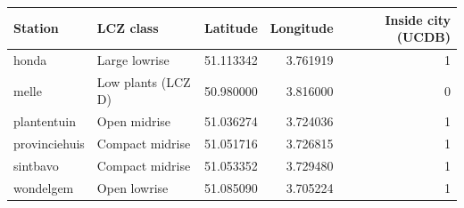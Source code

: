 \begin{tabular}{llrrr}
\toprule
Station & LCZ class & Latitude & Longitude & Inside city (UCDB) \\
\midrule
honda & Large lowrise & 51.113342 & 3.761919 & 1 \\
melle & Low plants (LCZ D) & 50.980000 & 3.816000 & 0 \\
plantentuin & Open midrise & 51.036274 & 3.724036 & 1 \\
provinciehuis & Compact midrise & 51.051716 & 3.726815 & 1 \\
sintbavo & Compact midrise & 51.053352 & 3.729480 & 1 \\
wondelgem & Open lowrise & 51.085090 & 3.705224 & 1 \\
\bottomrule
\end{tabular}
